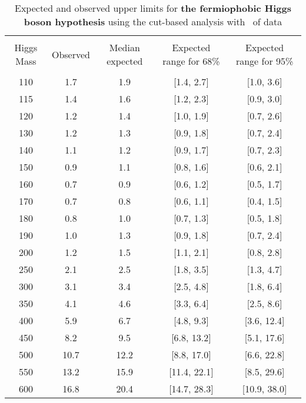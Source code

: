 \begin{table}[hbp!]
\begin{center}
\begin{tabular}{c c c c c}
\hline
\vspace{-3mm} && \\
 Higgs Mass   & Observed & Median expected & Expected range for 68\% & Expected range for 95\%   \\
\vspace{-3mm} && \\
\hline
110 & 1.7 & 1.9 & [1.4, 2.7] & [1.0, 3.6] \\
115 & 1.4 & 1.6 & [1.2, 2.3] & [0.9, 3.0] \\
120 & 1.2 & 1.4 & [1.0, 1.9] & [0.7, 2.6] \\
130 & 1.2 & 1.3 & [0.9, 1.8] & [0.7, 2.4] \\
140 & 1.1 & 1.2 & [0.9, 1.7] & [0.7, 2.3] \\
150 & 0.9 & 1.1 & [0.8, 1.6] & [0.6, 2.1] \\
160 & 0.7 & 0.9 & [0.6, 1.2] & [0.5, 1.7] \\
170 & 0.7 & 0.8 & [0.6, 1.1] & [0.4, 1.5] \\
180 & 0.8 & 1.0 & [0.7, 1.3] & [0.5, 1.8] \\
190 & 1.0 & 1.3 & [0.9, 1.8] & [0.7, 2.4] \\
200 & 1.2 & 1.5 & [1.1, 2.1] & [0.8, 2.8] \\
250 & 2.1 & 2.5 & [1.8, 3.5] & [1.3, 4.7] \\
300 & 3.1 & 3.4 & [2.5, 4.8] & [1.8, 6.4] \\
350 & 4.1 & 4.6 & [3.3, 6.4] & [2.5, 8.6] \\
400 & 5.9 & 6.7 & [4.8, 9.3] & [3.6, 12.4] \\
450 & 8.2 & 9.5 & [6.8, 13.2] & [5.1, 17.6] \\
500 & 10.7 & 12.2 & [8.8, 17.0] & [6.6, 22.8] \\
550 & 13.2 & 15.9 & [11.4, 22.1] & [8.5, 29.6] \\
600 & 16.8 & 20.4 & [14.7, 28.3] & [10.9, 38.0] \\
\hline
\end{tabular}
\caption{Expected and observed upper limits for {\bf the fermiophobic
    Higgs boson hypothesis} using the cut-based analysis with
  \intlumiEightTeV\ of data}
\label{tab:cutbase_uls_fp}
\end{center}
\end{table}
